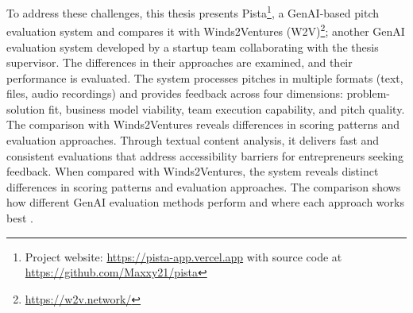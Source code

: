 To address these challenges, this thesis presents Pista\footnote{Project website: \url{https://pista-app.vercel.app} with source code
  at \url{https://github.com/Maxxy21/pista}}, a GenAI-based pitch evaluation system and compares it with Winds2Ventures (W2V)\footnote{\url{https://w2v.network/}}; another GenAI evaluation system developed by a startup team collaborating with the thesis supervisor.
The differences in their approaches are examined, and their performance is evaluated. The system processes pitches in multiple formats (text, files, audio recordings) and provides feedback across four dimensions: problem-solution fit, business model viability, team execution capability, and pitch quality. The comparison with Winds2Ventures reveals differences in scoring patterns and evaluation approaches.
Through textual content analysis, it delivers fast and consistent evaluations that address accessibility barriers for entrepreneurs seeking feedback. When compared with Winds2Ventures, the system reveals distinct differences in scoring patterns and evaluation approaches. The comparison shows how different GenAI evaluation methods perform and where each approach works best \cite{TheFutureofAIEv}.

